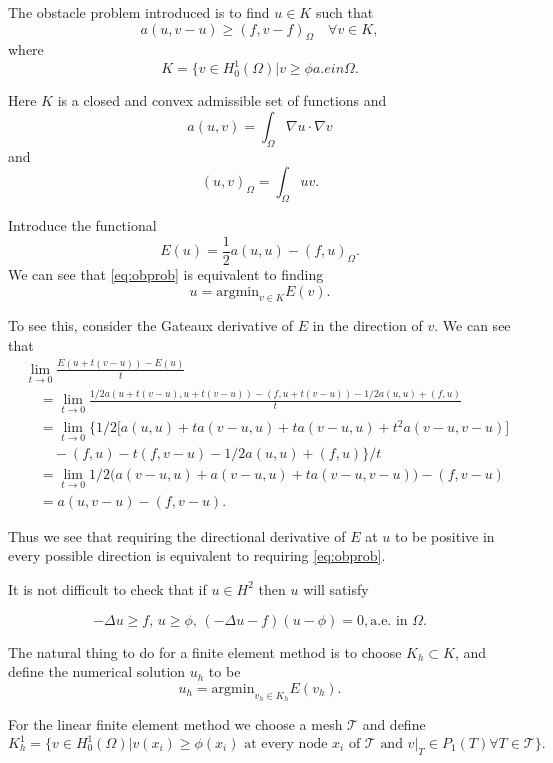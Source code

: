 \documentclass{article}
\begin{document}
The obstacle problem introduced is to find $u\in K$ such that
\begin{equation}
  \label{eq:obprob}
a(u,v-u)\ge (f,v-f)_\Omega\quad \forall v\in K, 
\end{equation}
where 
\[K=\{v \in H^1_0(\Omega)| v\ge \phi a.e in \Omega.\]

Here $K$ is a closed and convex admissible set of functions and 
\[a(u,v)=\int_\Omega \nabla u \cdot \nabla v\] 
and
\[(u,v)_\Omega=\int_\Omega uv.\]
 

Introduce the functional 
\[E(u)=\frac{1}{2}a(u,u)-(f,u)_\Omega.\]
We can see that \eqref{eq:obprob} is equivalent to finding 
\begin{equation}
  \label{eq:minprob}
  u=\text{argmin}_{v\in K} E(v).
\end{equation}

To see this, consider the Gateaux derivative of $E$ in the
direction of $v$.  We can see that
\begin{align}
  \label{eq:GateauxDeriv}
  &\lim_{t\rightarrow
    0}\frac{E(u+t(v-u))-E(u)}{t}\\
&\quad=\lim_{t\rightarrow
  0}\frac{1/2 a(u+t(v-u),u+t(v-u))-(f,u+t(v-u))-1/2 a(u,u)+(f,u)}{t}\\
&\quad=\lim_{t\rightarrow0}
 \bigg\{1/2\bigg[a(u,u)+ta(v-u,u)+ta(v-u,u)+t^2a(v-u,v-u)\bigg]\\
&\qquad -(f,u)-t(f,v-u)-1/2a(u,u)+(f,u)\bigg\}/t\\
&\quad=\lim_{t\rightarrow
  0}1/2\bigg(a(v-u,u)+a(v-u,u)+ta(v-u,v-u)\bigg)-(f,v-u)\\
&\quad=a(u,v-u)-(f,v-u).
\end{align}

Thus we see that requiring the directional derivative of $E$ at $u$ to
be positive in every possible direction is equivalent to requiring
\eqref{eq:obprob}.

It is not difficult to check that if $u\in H^2$ then $u$ will satisfy

\begin{equation}
  \label{eq:classical-formulation}
  -\Delta u \geq f,\,u\geq \phi,\, (-\Delta u -
  f)(u-\phi)=0,\text{a.e. in } \Omega.
\end{equation}


The natural thing to do for a finite element method is to choose
$K_h\subset K$, and define the numerical solution $u_h$ to be
\[u_h=\text{argmin}_{v_h\in K_h}E(v_h).\]

For the linear finite element method we choose a mesh $\mathcal{T}$
and define  
\[K_h^1=\{v\in H^1_0(\Omega)| v(x_i)\geq \phi(x_i) \text{ at every
  node } x_i \text{ of } \mathcal{T} \text{ and } v|_T\in P_1(T)
\forall T\in \mathcal{T}\}.\]
\end{document}
